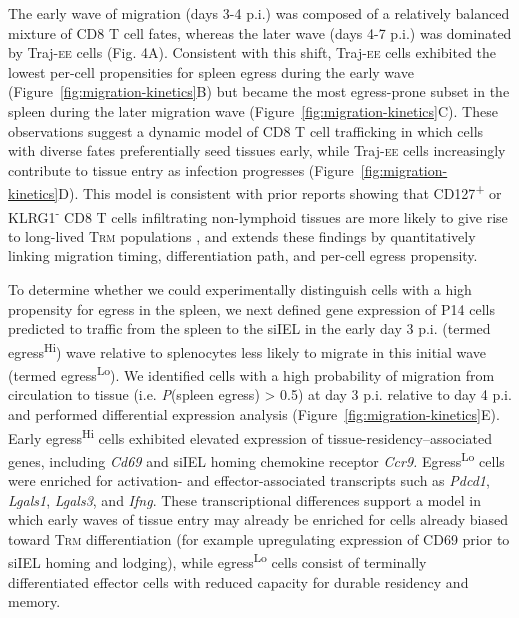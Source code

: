 The early wave of migration (days 3-4 p.i.) was composed of a relatively balanced mixture of CD8 T cell fates, whereas the later wave (days 4-7 p.i.) was dominated by Traj-\textsc{ee} cells (Fig. 4A). Consistent with this shift, Traj-\textsc{ee} cells exhibited the lowest per-cell propensities for spleen egress during the early wave (Figure~\ref{fig:migration-kinetics}B) but became the most egress-prone subset in the spleen during the later migration wave (Figure~\ref{fig:migration-kinetics}C). These observations suggest a dynamic model of CD8 T cell trafficking in which cells with diverse fates preferentially seed tissues early, while Traj-\textsc{ee} cells increasingly contribute to tissue entry as infection progresses (Figure~\ref{fig:migration-kinetics}D). This model is consistent with prior reports showing that CD127\textsuperscript{+} or KLRG1\textsuperscript{-} CD8 T cells infiltrating non-lymphoid tissues are more likely to give rise to long-lived T\textsc{rm} populations \citep{milnerRunx3ProgramsCD82017, mackayDevelopmentalPathwayCD103+CD82013, sheridanOralInfectionDrives2014}, and extends these findings by quantitatively linking migration timing, differentiation path, and per-cell egress propensity.

To determine whether we could experimentally distinguish cells with a high propensity for egress in the spleen, we next defined gene expression of P14 cells predicted to traffic from the spleen to the siIEL in the early day 3 p.i. (termed egress\textsuperscript{Hi}) wave relative to splenocytes less likely to migrate in this initial wave (termed egress\textsuperscript{Lo}). We identified cells with a high probability of migration from circulation to tissue (i.e. \emph{P}(spleen egress) \textgreater{} 0.5) at day 3 p.i. relative to day 4 p.i. and performed differential expression analysis (Figure~\ref{fig:migration-kinetics}E). Early egress\textsuperscript{Hi} cells exhibited elevated expression of tissue-residency--associated genes, including \emph{Cd69} and siIEL homing chemokine receptor \emph{Ccr9.} Egress\textsuperscript{Lo} cells were enriched for activation- and effector-associated transcripts such as \emph{Pdcd1}, \emph{Lgals1}, \emph{Lgals3}, and \emph{Ifng}. These transcriptional differences support a model in which early waves of tissue entry may already be enriched for cells already biased toward T\textsc{rm} differentiation (for example upregulating expression of CD69 prior to siIEL homing and lodging), while egress\textsuperscript{Lo} cells consist of terminally differentiated effector cells with reduced capacity for durable residency and memory.


